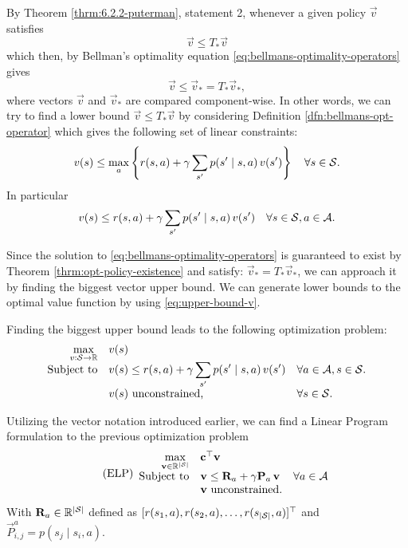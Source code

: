 By Theorem \ref{thrm:6.2.2-puterman}, statement 2, whenever a given policy
$\vec{v}$ satisfies
\[
    \vec{v} \leq T_* \vec{v}
\]
which then, by Bellman's optimality equation
\eqref{eq:bellmans-optimality-operators} gives
\[
    \vec{v} \leq \vec{v}_* = T_* \vec{v}_*,
\]
where vectors $\vec{v}$ and $\vec{v}_*$ are compared component-wise. In other
words, we can try to find a lower bound $\vec{v} \leq T_{*} \vec{v}$ by
considering Definition \ref{dfn:bellmans-opt-operator} which gives the following
set of linear constraints:
\[
    v(s) \leq \max_{a} \left\{ r(s, a) + \gamma \sum_{s'} p(s' \mid s, a) \, v(s') \right\} \quad \forall s \in \mathcal{S}.
\]
In particular
\begin{equation}
    \label{eq:upper-bound-v}
    v(s) \leq r(s, a) + \gamma \sum_{s'} p(s' \mid s, a) \, v(s') \quad \forall s \in \mathcal{S}, a \in \mathcal{A}.
\end{equation}

Since the solution to \eqref{eq:bellmans-optimality-operators} is guaranteed to
exist by Theorem \ref{thrm:opt-policy-existence} and satisfy: $\vec{v}_* = T_*
\vec{v}_*$, we can approach it by finding the biggest vector upper bound. We
can generate lower bounds to the optimal value function by using
\eqref{eq:upper-bound-v}.

Finding the biggest upper bound leads to the following optimization problem:
\begin{equation}
\begin{array}{rl@{}ll}
    \displaystyle \max_{v: \States \to \R} & v(s) \\
    \text{Subject to} & \displaystyle v(s) \leq r(s,a) + \gamma \sum_{s'} p(s' \mid s, a) \, v(s') & \quad \forall a \in \Actions, s \in \States. \\
    & v(s) \text{ unconstrained,} & \quad \forall s \in \States.
\end{array}
\end{equation}

Utilizing the vector notation introduced earlier, we can find a Linear Program formulation to the previous optimization problem
\begin{equation}
\label{lp:exact-lp}
\tag{ELP}
\begin{array}{rl@{}ll}
    \displaystyle \max_{\vec{v} \in \R^{|\States|}} & \vec{c}^{\top} \vec{v} \\
    \text{Subject to} & \vec{v} \leq \vec{R}_a + \gamma \vec{P}_a \, \vec{v} & \quad \forall a \in \Actions \\
    & \vec{v} \text{ unconstrained.} &
\end{array}
\end{equation}
With $\mathbf{R}_a \in \mathbb{R}^{|\mathcal{S}|}$ defined as $[r(s_1, a), r(s_2, a), \dots,
r(s_{|\mathcal{S}|}, a)]^{\top}$ and $\vec{P}_{i,j}^{a} = p(s_j \mid s_i, a)$.

